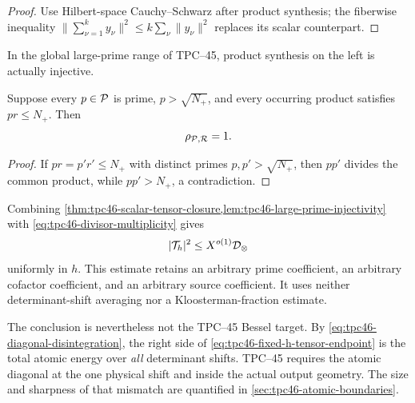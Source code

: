 \begin{proof}
Use Hilbert-space Cauchy--Schwarz after product synthesis; the
fiberwise inequality
\(
 \|\sum_{\nu=1}^k y_\nu\|^2\le k\sum_\nu\|y_\nu\|^2
\)
replaces its scalar counterpart.
\end{proof}

In the global large-prime range of TPC--45, product synthesis on the
left is actually injective.

\begin{lemma}
\label{lem:tpc46-large-prime-injectivity}
Suppose every \(p\in\mathcal P\) is prime, \(p>\sqrt{N_+}\), and every
occurring product satisfies \(pr\le N_+\).  Then
\begin{equation}
 \rho_{\mathcal P,\mathcal R}=1.
 \label{eq:tpc46-rho-pr-one}
\end{equation}
\end{lemma}

\begin{proof}
If \(pr=p'r'\le N_+\) with distinct primes \(p,p'>\sqrt{N_+}\),
then \(pp'\) divides the common product, while \(pp'>N_+\), a
contradiction.
\end{proof}

Combining
\cref{thm:tpc46-scalar-tensor-closure,lem:tpc46-large-prime-injectivity}
with \eqref{eq:tpc46-divisor-multiplicity} gives
\begin{equation}
 |\mathcal T_h|^2\le X^{o(1)}\mathcal D_\otimes
 \label{eq:tpc46-fixed-h-tensor-endpoint}
\end{equation}
uniformly in \(h\).  This estimate retains an arbitrary prime
coefficient, an arbitrary cofactor coefficient, and an arbitrary source
coefficient.  It uses neither determinant-shift averaging nor a
Kloosterman-fraction estimate.

The conclusion is nevertheless not the TPC--45 Bessel target.  By
\eqref{eq:tpc46-diagonal-disintegration}, the right side of
\eqref{eq:tpc46-fixed-h-tensor-endpoint} is the total atomic energy over
\emph{all} determinant shifts.  TPC--45 requires the atomic diagonal
at the one physical shift and inside the actual output geometry.  The
size and sharpness of that mismatch are quantified in
\cref{sec:tpc46-atomic-boundaries}.
